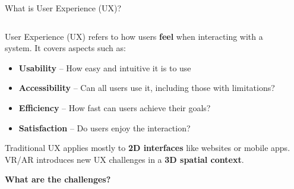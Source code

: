 \documentclass[aspectratio=169, table]{beamer}
\begin{document}
\begin{frame}{What is User Experience (UX)?}
	
	\begin{columns}[T]
		\begin{column}{0.7\textwidth}
			User Experience (UX) refers to how users \textbf{feel} when interacting with a system. It covers aspects such as:
			
			\vspace{5pt}
			\begin{itemize}
				\item \textbf{Usability} – How easy and intuitive it is to use
				\item \textbf{Accessibility} – Can all users use it, including those with limitations?
				\item \textbf{Efficiency} – How fast can users achieve their goals?
				\item \textbf{Satisfaction} – Do users enjoy the interaction?
			\end{itemize}
			
			\vspace{5pt}
			Traditional UX applies mostly to \textbf{2D interfaces} like websites or mobile apps. VR/AR introduces new UX challenges in a \textbf{3D spatial context}.
			
			\vspace{8pt}
			\centering
			\large
			\textbf{What are the challenges?}
		\end{column}
		\begin{column}{0.2\textwidth}
		\end{column}
	\end{columns}
	
\end{frame}
\end{document}
